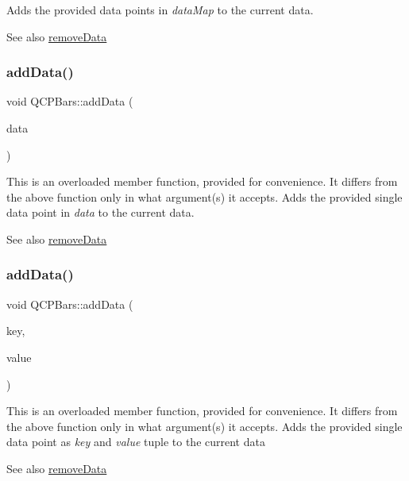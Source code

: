 Adds the provided data points in {\itshape data\+Map} to the current data. \begin{DoxySeeAlso}{See also}
\hyperlink{class_q_c_p_bars_a1fe9bcb57d670defea1bb65cadf43765}{remove\+Data} 
\end{DoxySeeAlso}
\hypertarget{class_q_c_p_bars_a142158b1addefd53259002dd3ab22c3a}{}\label{class_q_c_p_bars_a142158b1addefd53259002dd3ab22c3a} 
\subsubsection{\texorpdfstring{add\+Data()}{addData()}\hspace{0.1cm}{\footnotesize\ttfamily [2/4]}}
{\footnotesize\ttfamily void Q\+C\+P\+Bars\+::add\+Data (\begin{DoxyParamCaption}\item[{const \hyperlink{class_q_c_p_bar_data}{Q\+C\+P\+Bar\+Data} \&}]{data }\end{DoxyParamCaption})}

This is an overloaded member function, provided for convenience. It differs from the above function only in what argument(s) it accepts. Adds the provided single data point in {\itshape data} to the current data. \begin{DoxySeeAlso}{See also}
\hyperlink{class_q_c_p_bars_a1fe9bcb57d670defea1bb65cadf43765}{remove\+Data} 
\end{DoxySeeAlso}
\hypertarget{class_q_c_p_bars_a684dd105403a5497fda42f2094fecbb7}{}\label{class_q_c_p_bars_a684dd105403a5497fda42f2094fecbb7} 
\subsubsection{\texorpdfstring{add\+Data()}{addData()}\hspace{0.1cm}{\footnotesize\ttfamily [3/4]}}
{\footnotesize\ttfamily void Q\+C\+P\+Bars\+::add\+Data (\begin{DoxyParamCaption}\item[{double}]{key,  }\item[{double}]{value }\end{DoxyParamCaption})}

This is an overloaded member function, provided for convenience. It differs from the above function only in what argument(s) it accepts. Adds the provided single data point as {\itshape key} and {\itshape value} tuple to the current data \begin{DoxySeeAlso}{See also}
\hyperlink{class_q_c_p_bars_a1fe9bcb57d670defea1bb65cadf43765}{remove\+Data} 
\end{DoxySeeAlso}
\hypertarget{class_q_c_p_bars_a3679a0a9decab0fa03f8f4c6e3344d52}{}\label{class_q_c_p_bars_a3679a0a9decab0fa03f8f4c6e3344d52} 
